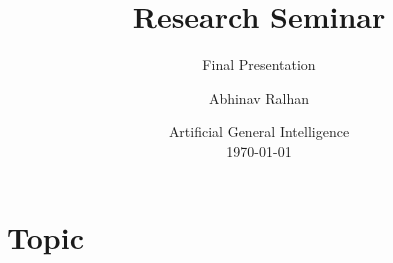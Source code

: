 \documentclass[
	11pt, %
]{beamer}
\title[Research Seminar]{Research Seminar} %
\subtitle{Final Presentation} %
\author[Abhinav Ralhan]{Abhinav Ralhan} %
\institute[UniKo]{University of Koblenz \\ \smallskip \textit{abhinavr8@uni-koblenz.de}} %
\date[\today]{Artificial General Intelligence \\ \today} %
\begin{document}

\begin{frame}
	\titlepage %
\end{frame}

\section{Topic} %
\end{document}
